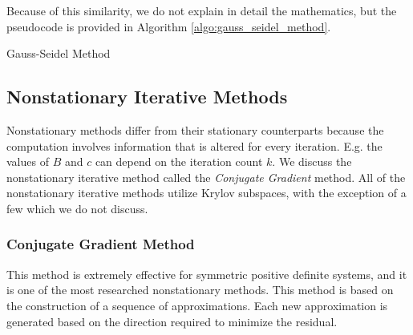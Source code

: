 \documentclass[../fem.tex]{subfiles}
\begin{document}
\begin{Figure}
   \begin{center}
     
   \end{center}
   \label{fig:gs_err}
\end{Figure}

Because of this similarity, we do not explain in detail the mathematics, but the
pseudocode is provided in Algorithm \ref{algo:gauss_seidel_method}.

\begin{algorithm}[H]
  \caption{Gauss-Seidel Method}\label{algo:gauss_seidel_method}
  \begin{algorithmic}
    \EndFor
    \EndFor
    \EndIf
    \EndFor
  \end{algorithmic}
\end{algorithm}

\subsection{Nonstationary Iterative Methods}%
\label{sub:nonstationary_iterative_methods}

Nonstationary methods differ from their stationary counterparts because the
computation involves information that is altered for every iteration. E.g. the
values of $B$ and $c$ can depend on the iteration count $k$. We discuss the
nonstationary iterative method called the  \textit{Conjugate Gradient} method.
All of the nonstationary iterative methods utilize Krylov subspaces, with the
exception of a few which we do not discuss.

\subsubsection{Conjugate Gradient Method}%
\label{ssub:conjugate_gradient_method}

This method is extremely effective for symmetric positive definite systems, and
it is one of the most researched nonstationary methods. This method is based on
the construction of a sequence of approximations. Each new approximation is
generated based on the direction required to minimize the residual.
\end{document}
